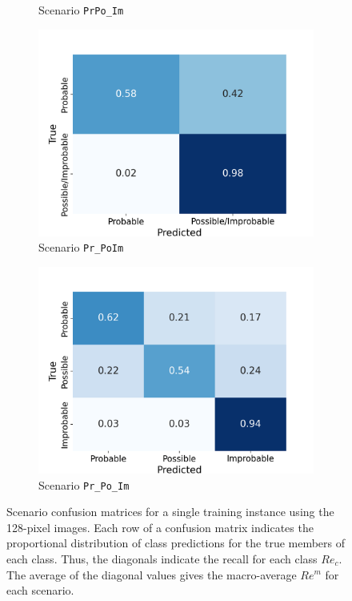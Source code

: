 \documentclass[Journal,letterpaper, SingleSpace, InsideFigs]{ascelike-new}
\begin{document}
\begin{figure}[ht]
\begin{subfigure}[t]{.45\linewidth}
    \caption{Scenario \texttt{PrPo\_Im}}
    \label{prpo_im_cm}
  \end{subfigure}%
  
  \begin{subfigure}[t]{.45\linewidth}
    \centering
    \includegraphics[width=\linewidth, trim={0 0 1cm 1cm}, clip]{opt-confusion-matrix-Pr_PoIm-128-px.png}
    \caption{Scenario \texttt{Pr\_PoIm}}
    \label{pr_poim_cm}
\end{subfigure}%
  \begin{subfigure}[t]{.45\linewidth}
    \centering
    \includegraphics[width=\linewidth, trim={0 0 1cm 1cm}, clip]{opt-confusion-matrix-Pr_Po_Im-128-px.png}
    \caption{Scenario \texttt{Pr\_Po\_Im}}
    \label{pr_po_im_cm}
  \end{subfigure}%
  \caption{Scenario confusion matrices for a single training instance using the 128-pixel images.  Each row of a
    confusion matrix indicates the proportional distribution of class predictions for the true members of each
    class. Thus, the diagonals indicate the recall for each class $Re_c$. The average of the diagonal values gives the
    macro-average $Re^m$ for each scenario.}
    \label{fig:confusion-matrix}
  \end{figure}
\end{document}
